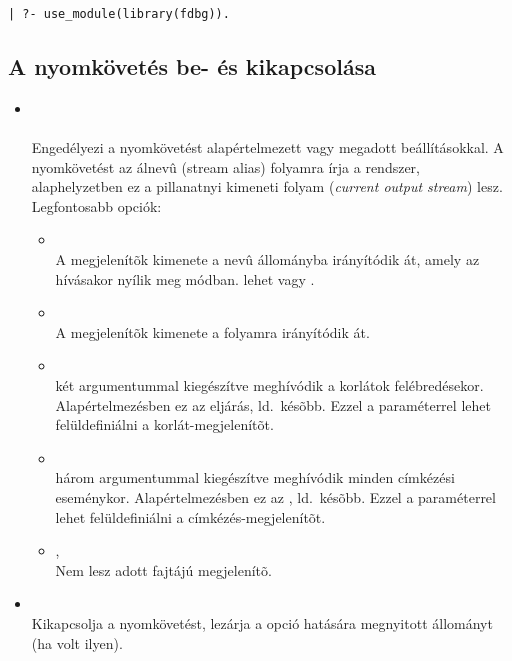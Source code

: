 \begin{verbatim}
| ?- use_module(library(fdbg)).
\end{verbatim}

\subsection{A nyomkövetés be- és kikapcsolása}

\begin{itemize}
\item {}\\ \\
Engedélyezi a nyomkövetést alapértelmezett vagy megadott beállításokkal. A
nyomkövetést az  álnevû (stream alias) folyamra írja a
rendszer, alaphelyzetben ez a pillanatnyi kimeneti folyam ({\em current
output stream}) lesz. Legfontosabb opciók:\\
\begin{itemize}
\item {}\\
  A megjelenítõk kimenete a  nevû állományba irányítódik
  át, amely az  hívásakor nyílik meg  módban.
   lehet  vagy .
\item {}\\
  A megjelenítõk kimenete a  folyamra irányítódik át.
\item {}\\
   két argumentummal kiegészítve meghívódik a korlátok
  felébredésekor. Alapértelmezésben ez az  eljárás, ld.~késõbb.
  Ezzel a paraméterrel lehet felüldefiniálni a korlát-megjelenítõt.
\item {}\\
   három argumentummal kiegészítve meghívódik minden címkézési
  eseménykor. Alapértelmezésben ez az , ld.~késõbb.
  Ezzel a paraméterrel lehet felüldefiniálni a címkézés-megjelenítõt.
\item {}, \\ 
  Nem lesz adott fajtájú megjelenítõ.
\end{itemize}

\item {}\\
  Kikapcsolja a nyomkövetést, lezárja a  opció hatására megnyitott
  állományt (ha volt ilyen).
\end{itemize}

